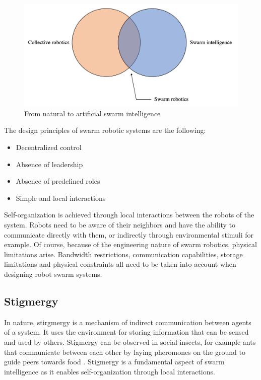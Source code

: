 \begin{figure}[h]
    \centering
    \includegraphics[width=0.99\columnwidth]{images/vennes.png}
    \caption{From natural to artificial swarm intelligence}
    \label{venne}
\end{figure}

The design principles of swarm robotic systems are the following: 
\begin{itemize}
    \item Decentralized control
    \item Absence of leadership
    \item Absence of predefined roles
    \item Simple and local interactions
\end{itemize}

Self-organization is achieved through local interactions between the robots of the system. Robots need to be aware of their neighbors and have the ability to communicate directly with them, or indirectly through environmental stimuli for example. Of course, because of the engineering nature of swarm robotics, physical limitations arise. Bandwidth restrictions, communication capabilities, storage limitations and physical constraints all need to be taken into account when designing robot swarm systems.

\subsection{Stigmergy}
In nature, stirgmergy is a mechanism of indirect communication between agents of a system. It uses the environment for storing information that can be sensed and used by others. Stigmergy can be observed in social insects, for example ants that communicate between each other by laying pheromones on the ground to guide peers towards food \cite{bonabeau1999swarm}. Stigmergy is a fundamental aspect of swarm intelligence as it enables self-organization through local interactions.

